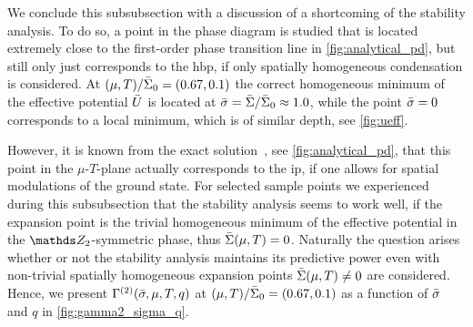 	We conclude this subsubsection with a discussion of a shortcoming of the stability analysis.
To do so, a point in the phase diagram  is studied that is located extremely close to the first-order phase transition line in \cref{fig:analytical_pd}, but still only just corresponds to the \gls{hbp}, if only spatially homogeneous condensation is considered.
At ${( \mu, T )/\bar{\Sigma}_0 = ( 0.67, 0.1 )}$ the correct homogeneous minimum of the effective potential $\bar{U}$ is located at ${\bar{\sigma} = \bar{\Sigma}/\bar{\Sigma}_0 \approx 1.0}$, while the point ${\bar{\sigma} = 0}$ corresponds to a local minimum, which is of similar depth, see \cref{fig:ueff}.

However, it is known from the exact solution~\cite{Schnetz:2004vr,Schnetz:2005ih,Schnetz:2005vh}, see \cref{fig:analytical_pd}, that this point in the $\mu$-$T$-plane actually corresponds to the \gls{ip}, if one allows for spatial modulations of the ground state.
For selected sample points we experienced during this subsubsection that the stability analysis seems to work well, if the expansion point is the trivial homogeneous minimum of the effective potential in the $\Z_2$-symmetric phase, thus ${\bar{\Sigma} ( \mu, T ) = 0}$.
Naturally the question arises whether or not the stability analysis maintains its predictive power even with non-trivial spatially homogeneous expansion points $\bar{\Sigma} ( \mu, T ) \neq 0$ are considered.
Hence, we present $\Gamma^{(2)} ( \bar{\sigma}, \mu, T, q)$ at ${( \mu, T )/\bar{\Sigma}_0 = ( 0.67, 0.1 )}$ as a function of $\bar{\sigma}$ and $q$ in \cref{fig:gamma2_sigma_q}.


